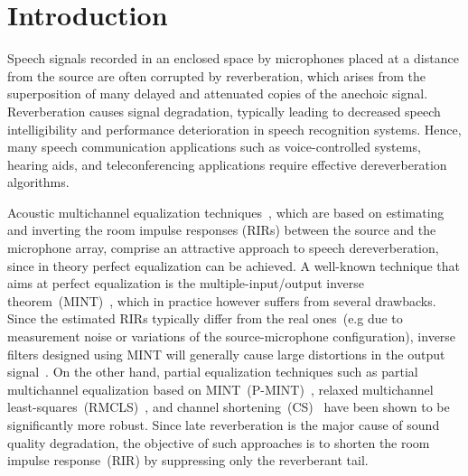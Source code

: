 \documentclass{article}
\begin{document}
\section{Introduction}
\label{sec:intro}
\vspace{-0.2cm}

Speech signals recorded in an enclosed space by microphones placed at a distance from the source are often corrupted by reverberation, which arises from the superposition of many delayed and attenuated copies of the anechoic signal.
Reverberation causes signal degradation, typically leading to decreased speech intelligibility and performance deterioration in speech recognition systems.
Hence, many speech communication applications such as voice-controlled systems, hearing aids, and teleconferencing applications require effective dereverberation algorithms.

Acoustic multichannel equalization techniques~\cite{Zhang_IWAENC_2010,Kodrasi_ICASSP_2012, Miyoshi_ITASS_1988}, which are based on estimating and inverting the room impulse responses (RIRs) between the source and the microphone array, comprise an attractive approach to speech dereverberation, since in theory perfect equalization can be achieved.
A well-known technique that aims at perfect equalization is the multiple-input/output inverse theorem~(MINT)~\cite{Miyoshi_ITASS_1988}, which in practice however suffers from several drawbacks.
Since the estimated RIRs typically differ from the real ones~(e.g due to measurement noise or variations of the source-microphone configuration), inverse filters designed using MINT will generally cause large distortions in the output signal~\cite{Radlovic_ITSA_2000}.
On the other hand, partial equalization techniques such as partial multichannel equalization based on MINT~(P-MINT)~\cite{Kodrasi_ICASSP_2012}, relaxed multichannel least-squares~(RMCLS)~\cite{Zhang_IWAENC_2010}, and channel shortening~(CS)~\cite{Kallinger_ICASSP_2006} have been shown to be significantly more robust.
Since late reverberation is the major cause of sound quality degradation, the objective of such approaches is to shorten the room impulse response~(RIR) by suppressing only the reverberant tail.
\end{document}
